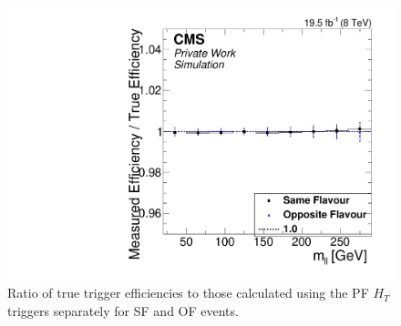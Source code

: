 \begin{figure}
\begin{center}
\includegraphics[scale=0.35]{plots/BG/trigger/Triggereff_AlphaTSyst_PFHT_HighHTExclusive_Full2012_Mll_None.pdf}
\caption{Ratio of true trigger efficiencies to those calculated using the PF $H_T$ triggers separately for SF and OF events.}
\label{fig:triggerEffBias}
\end{center}
\end{figure}
